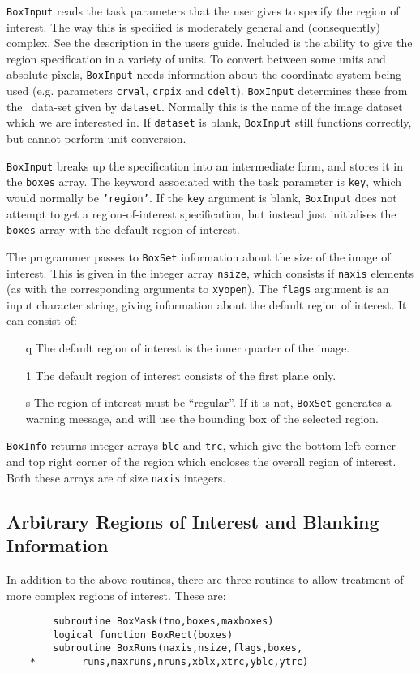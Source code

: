 \documentclass{report}
\begin{document}
{\tt BoxInput} reads the task parameters that the user gives to
specify the region of interest. The way this is specified is moderately
general and (consequently) complex. See the description in the users guide.
Included is the ability to give the region specification in a variety of
units. To convert between some units and absolute pixels, {\tt BoxInput}
needs information about the coordinate system being used (e.g.
parameters {\tt crval}, {\tt crpix} and {\tt cdelt}). {\tt BoxInput} determines
these from the \miriad\ data-set given by {\tt dataset}. Normally this is the name
of the image dataset which we are interested in. If {\tt dataset} is
blank, {\tt BoxInput} still functions correctly, but cannot perform unit
conversion.

{\tt BoxInput} breaks up the specification into an intermediate form, and
stores it in the {\tt boxes} array.
The keyword associated with the task parameter is {\tt key},
which would normally be {\tt 'region'}. If the {\tt key} argument is blank,
{\tt BoxInput} does not attempt to get a region-of-interest specification,
but instead just initialises the {\tt boxes} array with the default
region-of-interest.

The programmer passes to {\tt BoxSet} information about the size of the image
of interest. This is given in the integer array {\tt nsize}, which consists
if {\tt naxis} elements (as with the corresponding arguments to {\tt xyopen}).
The {\tt flags} argument is an input character string, giving information
about the default region of interest. It can consist of:
\begin{itemize}
\item[q] The default region of interest is the inner quarter of the image.
\item[1] The default region of interest consists of the first plane only.
\item[s] The region of interest must be ``regular''. If it is not, {\tt BoxSet}
generates a warning message, and will use the bounding box of the selected
region.
\end{itemize}

{\tt BoxInfo} returns integer arrays {\tt blc} and {\tt trc}, which give the
bottom
left corner and top right corner of the region which encloses the overall
region of interest. Both these arrays are of size {\tt naxis} integers.

\subsection{Arbitrary Regions of Interest and Blanking Information}
In addition to the above routines, there are three routines to allow treatment
of more complex regions of interest. These are:
\begin{verbatim}
        subroutine BoxMask(tno,boxes,maxboxes)
        logical function BoxRect(boxes)
        subroutine BoxRuns(naxis,nsize,flags,boxes,
    *        runs,maxruns,nruns,xblx,xtrc,yblc,ytrc)
\end{verbatim}
\end{document}
